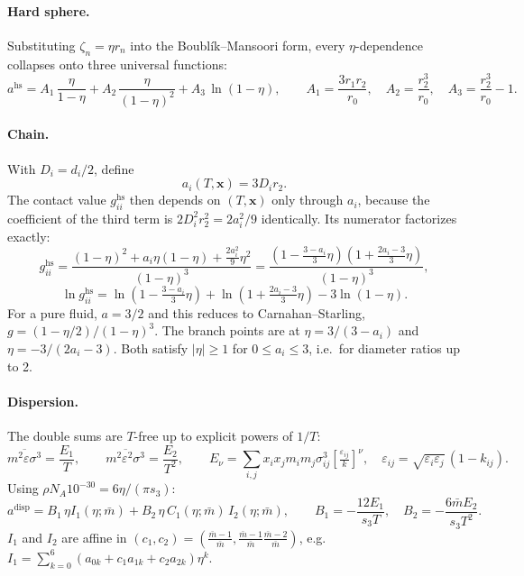 \documentclass[11pt]{article}
\newcommand{\mbar}{\bar m}
\begin{document}
\paragraph{Hard sphere.}
Substituting $\zeta_n = \eta r_n$ into the Boubl\'ik--Mansoori form, every $\eta$-dependence
collapses onto three universal functions:
\begin{equation}
a^{\mathrm{hs}} = A_1\,\frac{\eta}{1-\eta} + A_2\,\frac{\eta}{(1-\eta)^2} + A_3\,\ln(1-\eta),
\qquad A_1 = \frac{3 r_1 r_2}{r_0},\quad A_2 = \frac{r_2^3}{r_0},\quad A_3 = \frac{r_2^3}{r_0}-1 .
\end{equation}

\paragraph{Chain.} With $D_i = d_i/2$, define
\begin{equation}
a_i(T,\mathbf x) = 3 D_i r_2 .
\end{equation}
The contact value $g_{ii}^{\mathrm{hs}}$ then depends on $(T,\mathbf x)$ only through $a_i$,
because the coefficient of the third term is $2D_i^2r_2^2 = 2a_i^2/9$ identically. Its numerator
factorizes exactly:
\begin{equation}
g_{ii}^{\mathrm{hs}} = \frac{(1-\eta)^2 + a_i\eta(1-\eta) + \tfrac{2a_i^2}{9}\eta^2}{(1-\eta)^3}
= \frac{\left(1-\tfrac{3-a_i}{3}\eta\right)\left(1+\tfrac{2a_i-3}{3}\eta\right)}{(1-\eta)^3},
\end{equation}
\begin{equation}
\ln g_{ii}^{\mathrm{hs}} = \ln\!\left(1-\tfrac{3-a_i}{3}\eta\right) + \ln\!\left(1+\tfrac{2a_i-3}{3}\eta\right) - 3\ln(1-\eta).
\end{equation}
For a pure fluid, $a = 3/2$ and this reduces to Carnahan--Starling,
$g = (1-\eta/2)/(1-\eta)^3$. The branch points are at
$\eta = 3/(3-a_i)$ and $\eta = -3/(2a_i-3)$. Both satisfy $|\eta|\ge 1$ for
$0 \le a_i \le 3$, i.e.\ for diameter ratios up to 2.

\paragraph{Dispersion.}
The double sums are $T$-free up to explicit powers of $1/T$:
\begin{equation}
\overline{m^2\varepsilon\sigma^3} = \frac{E_1}{T},\qquad
\overline{m^2\varepsilon^2\sigma^3} = \frac{E_2}{T^2},\qquad
E_\nu = \sum_{i,j} x_i x_j m_i m_j \sigma_{ij}^3 \left[\tfrac{\varepsilon_{ij}}{k}\right]^\nu,
\quad \varepsilon_{ij} = \sqrt{\varepsilon_i\varepsilon_j}\,(1-k_{ij}).
\end{equation}
Using $\rho N_A 10^{-30} = 6\eta/(\pi s_3)$:
\begin{equation}
a^{\mathrm{disp}} = B_1\,\eta I_1(\eta;\mbar) + B_2\,\eta\,C_1(\eta;\mbar)\,I_2(\eta;\mbar),
\qquad B_1 = -\frac{12 E_1}{s_3 T},\quad B_2 = -\frac{6\mbar E_2}{s_3 T^2}.
\end{equation}
$I_1$ and $I_2$ are affine in $(c_1,c_2) = \left(\frac{\mbar-1}{\mbar},\frac{\mbar-1}{\mbar}\frac{\mbar-2}{\mbar}\right)$,
e.g.\ $I_1 = \sum_{k=0}^{6}\left(a_{0k} + c_1 a_{1k} + c_2 a_{2k}\right)\eta^k$.
\end{document}
